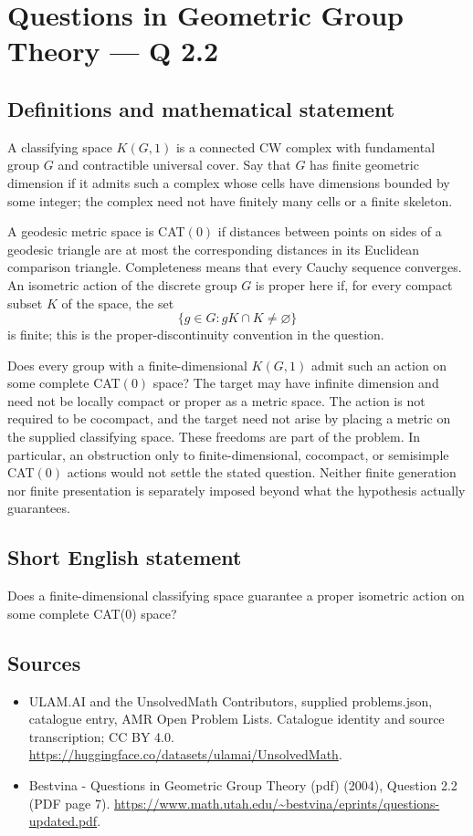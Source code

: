 \documentclass[11pt,a4paper]{article}
\begin{document}
\section*{Questions in Geometric Group Theory — Q 2.2}\label{statement}

\subsection{Definitions and mathematical statement}
A classifying space $K(G,1)$ is a connected CW complex with fundamental group $G$ and contractible universal cover. Say that $G$ has finite geometric dimension if it admits such a complex whose cells have dimensions bounded by some integer; the complex need not have finitely many cells or a finite skeleton.

A geodesic metric space is CAT$(0)$ if distances between points on sides of a geodesic triangle are at most the corresponding distances in its Euclidean comparison triangle. Completeness means that every Cauchy sequence converges. An isometric action of the discrete group $G$ is proper here if, for every compact subset $K$ of the space, the set
\[
 \{g\in G:gK\cap K\ne\varnothing\}
\]
is finite; this is the proper-discontinuity convention in the question.

Does every group with a finite-dimensional $K(G,1)$ admit such an action on some complete CAT$(0)$ space? The target may have infinite dimension and need not be locally compact or proper as a metric space. The action is not required to be cocompact, and the target need not arise by placing a metric on the supplied classifying space. These freedoms are part of the problem. In particular, an obstruction only to finite-dimensional, cocompact, or semisimple CAT$(0)$ actions would not settle the stated question. Neither finite generation nor finite presentation is separately imposed beyond what the hypothesis actually guarantees.
\subsection{Short English statement}
Does a finite-dimensional classifying space guarantee a proper isometric action on some complete CAT(0) space?
\subsection{Sources}
\begin{itemize}
\item[S1] ULAM.AI and the UnsolvedMath Contributors, supplied problems.json, catalogue entry, AMR Open Problem Lists. Catalogue identity and source transcription; CC BY 4.0.
\url{https://huggingface.co/datasets/ulamai/UnsolvedMath}.
\item[S2] Bestvina - Questions in Geometric Group Theory (pdf) (2004), Question 2.2 (PDF page 7). 
\url{https://www.math.utah.edu/~bestvina/eprints/questions-updated.pdf}.
\end{itemize}
\end{document}

